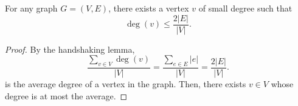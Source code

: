 
\begin{lemma}
	For any graph \( G = (V,E) \), there exists a vertex \( v \) of small degree such that \[
		\deg(v) \le \frac{2|E|}{|V|}
	.\] 
\end{lemma}
\begin{proof}
	By the handshaking lemma, \[
		\frac{\sum_{v \in V} \deg(v)}{|V|} = \frac{\sum_{e \in E}|e|}{|V|} = \frac{2|E|}{|V|}
	.\] is the average degree of a vertex in the graph. Then, there exists \( v \in V \) whose degree is at most the average.
\end{proof} 
